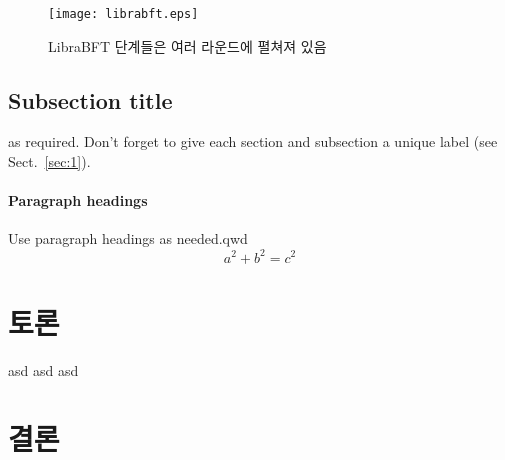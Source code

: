 \begin{figure}
  \texttt{[image: librabft.eps]}
\caption{LibraBFT 단계들은 여러 라운드에 펼쳐져 있음}
\label{fig:2}       %
\end{figure}


\subsection{Subsection title}
\label{sec:11}
as required. Don't forget to give each section
and subsection a unique label (see Sect.~\ref{sec:1}).
\paragraph{Paragraph headings} Use paragraph headings as needed.qwd 
\begin{equation}
a^2+b^2=c^2
\end{equation}

%
%

\section{토론}
\label{sec:2}
asd asd asd
\cite{castro1999practical}
\cite{yin2019hotstuff}
\cite{librabft}
\section{결론}
\label{sec:3}

